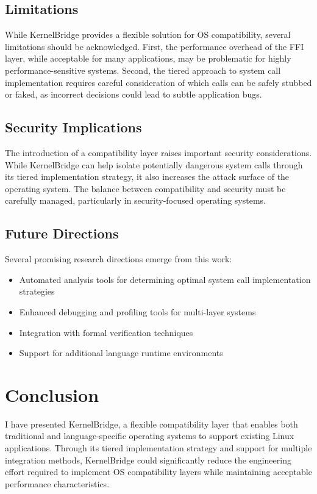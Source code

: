 \documentclass[conference]{IEEEtran}
\begin{document}
\subsection{Limitations}

While KernelBridge provides a flexible solution for OS compatibility, several limitations should be
acknowledged. First, the performance overhead of the FFI layer, while acceptable for many
applications, may be problematic for highly performance-sensitive systems. Second, the tiered approach to system call implementation requires careful consideration of which calls can be safely stubbed or faked, as incorrect decisions could lead to subtle application bugs.

\subsection{Security Implications}
The introduction of a compatibility layer raises important security considerations. While KernelBridge can help isolate potentially dangerous system calls through its tiered implementation strategy, it also increases the attack surface of the operating system. The balance between compatibility and security must be carefully managed, particularly in security-focused operating systems.

\subsection{Future Directions}
Several promising research directions emerge from this work:
\begin{itemize}
	\item Automated analysis tools for determining optimal system call implementation strategies
	\item Enhanced debugging and profiling tools for multi-layer systems
	\item Integration with formal verification techniques
	\item Support for additional language runtime environments
\end{itemize}

\section{Conclusion}
I have presented KernelBridge, a flexible compatibility layer that enables both traditional and
language-specific operating systems to support existing Linux applications. Through its tiered
implementation strategy and support for multiple integration methods, KernelBridge could significantly reduce the engineering effort required to implement OS compatibility layers while maintaining acceptable performance characteristics.
\end{document}
